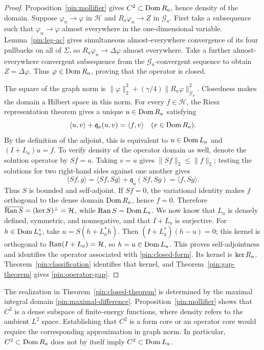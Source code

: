 \begin{proof}
Proposition~\ref{pin:mollifier} gives $C^2\subset\operatorname{Dom} R_a$, hence
density of the domain. Suppose $\varphi_n\to\varphi$ in $\mathcal H$
and $R_a\varphi_n\to Z$ in $\mathcal G_a$. First take a subsequence
such that $\varphi_n\to\varphi$ almost everywhere in the
one-dimensional variable. Lemma~\ref{pin:leg-ac} gives simultaneous
almost-everywhere convergence of its four pullbacks on all of
$\Sigma$, so $R_a\varphi_n\to\Delta\varphi$ almost everywhere.
Take a further almost-everywhere convergent subsequence from the
$\mathcal G_a$-convergent sequence to obtain $Z=\Delta\varphi$.
Thus $\varphi\in\operatorname{Dom} R_a$, proving that the operator is closed.

The square of the graph norm is
$\|\varphi\|_2^2+(\gamma/4)\|R_a\varphi\|_{\mathcal G_a}^2$.
Closedness makes the domain a Hilbert space in this norm. For every
$f\in\mathcal H$, the Riesz representation theorem gives a unique
$u\in\operatorname{Dom} R_a$ satisfying
\[
      \langle u,v\rangle+\mathfrak q_a(u,v)=\langle f,v\rangle
                    \quad(v\in\operatorname{Dom} R_a).
\]
By the definition of the adjoint, this is equivalent to
$u\in\operatorname{Dom} L_a$ and $(I+L_a)u=f$. To verify density of the operator
domain as well, denote the solution operator by $Sf=u$. Taking $v=u$
gives $\|Sf\|_2\le\|f\|_2$; testing the solutions for two
right-hand sides against one another gives
\[
 \langle Sf,g\rangle
   =\langle Sf,Sg\rangle+\mathfrak q_a(Sf,Sg)
   =\langle f,Sg\rangle.
\]
Thus $S$ is bounded and self-adjoint. If $Sf=0$, the variational
identity makes $f$ orthogonal to the dense domain $\operatorname{Dom} R_a$, hence
$f=0$. Therefore $\overline{\operatorname{Ran} S}=(\operatorname{ker} S)^{\perp}=\mathcal H$,
while $\operatorname{Ran} S=\operatorname{Dom} L_a$. We now know that $L_a$ is densely defined,
symmetric, and nonnegative, and that $I+L_a$ is surjective. For
$h\in\operatorname{Dom} L_a^*$, take $u=S(h+L_a^*h)$. Then
$(I+L_a^*)(h-u)=0$; this kernel is orthogonal to
$\operatorname{Ran}(I+L_a)=\mathcal H$, so $h=u\in\operatorname{Dom} L_a$. This proves
self-adjointness and identifies the operator associated with
\eqref{pin:closed-form}. Its kernel is $\operatorname{ker} R_a$.
Theorem~\ref{pin:classification} identifies that kernel, and
Theorem~\ref{pin:gap-theorem} gives \eqref{pin:operator-gap}.
\end{proof}

The realization in Theorem~\ref{pin:closed-theorem} is determined by
the maximal integral domain \eqref{pin:maximal-difference}.
Proposition~\ref{pin:mollifier} shows that $C^2$ is a dense subspace
of finite-energy functions, where density refers to the ambient
$L^2$ space. Establishing that $C^2$ is a form core or an operator
core would require the corresponding approximation in graph norm.
In particular, $C^2\subset\operatorname{Dom} R_a$ does not by itself imply
$C^2\subset\operatorname{Dom} L_a$.

